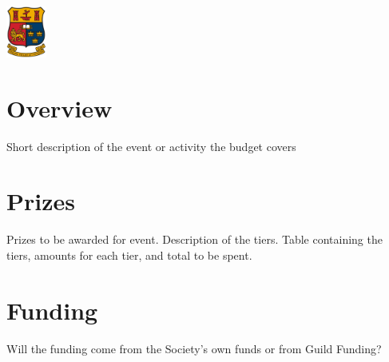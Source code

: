 \documentclass[11pt]{article}
\begin{document}
\begin{titlepage}
\includegraphics[width=50px, keepaspectratio]{ucc.jpg}\\[1cm] %
 

\vfill %

\end{titlepage}


\section*{Overview}
Short description of the event or activity the budget covers

\section*{Prizes}
Prizes to be awarded for event. Description of the tiers. Table containing the tiers, amounts for each tier, and total to be spent.

\section*{Funding}
Will the funding come from the Society's own funds or from Guild Funding?
\end{document}
